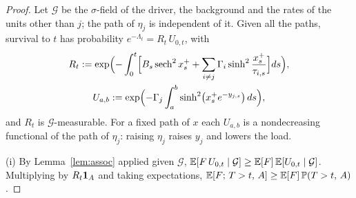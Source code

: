 \begin{proof}
Let $\mathcal G$ be the $\sigma$-field of the driver, the background and
the rates of the units other than $j$; the path of $\eta_j$ is
independent of it. Given all the paths, survival to $t$ has probability
$e^{-\Lambda_t}=R_t\,U_{0,t}$, with
\begin{gather*}
R_t:=\exp\Bigl(-\int_0^t\Bigl[B_s\operatorname{sech}^2x_s^+
+\sum_{i\neq j}\Gamma_i\sinh^2\frac{x_s^+}{\tau_{i,s}}\Bigr]ds\Bigr),\\
U_{a,b}:=\exp\Bigl(-\Gamma_j\int_a^b\sinh^2\bigl(x_s^+e^{-y_{j,s}}\bigr)\,ds\Bigr),
\end{gather*}
and $R_t$ is $\mathcal G$-measurable. For a fixed path of $x$ each
$U_{a,b}$ is a nondecreasing functional of the path of $\eta_j$: raising
$\eta_j$ raises $y_j$ and lowers the load.

(i) By Lemma~\ref{lem:assoc} applied given $\mathcal G$,
$\mathbb{E}[F\,U_{0,t}\mid\mathcal G]\ge\mathbb{E}[F]\,\mathbb{E}[U_{0,t}\mid\mathcal G]$.
Multiplying by $R_t\mathbf{1}_A$ and taking expectations,
$\mathbb{E}[F;\,T>t,\,A]\ge\mathbb{E}[F]\,\mathbb{P}(T>t,\,A)$.


\end{proof}
